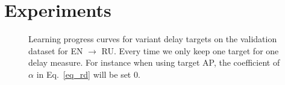 \section{Experiments}
\label{sec:experiments}
\begin{figure}[hptb]
\centering
{}

\caption{{Learning progress curves for variant delay targets on the validation dataset for EN $\rightarrow$ RU. Every time we only keep one target for one delay measure. For instance when using target AP, the coefficient of $\alpha$ in Eq.~\ref{eq_rd} will be set $0$.}}
\label{fig.lr}
\vspace{-7pt}
\end{figure}

